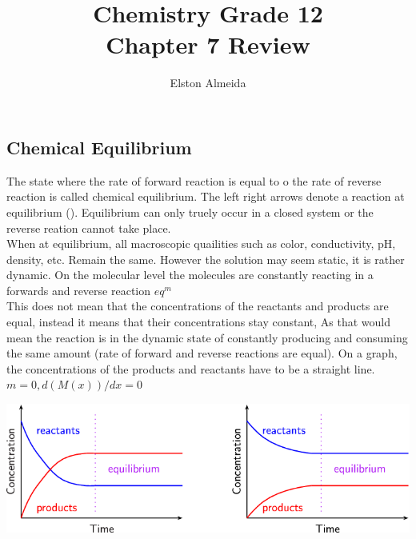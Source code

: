 \documentclass{article}
\begin{document}
\author{Elston Almeida}
\title{Chemistry Grade 12 \\ Chapter 7 Review}
\maketitle

\setcounter{section}{7}

\subsection{Chemical Equilibrium}

\begin{paragraph}
  \noindent
  The state where the rate of forward reaction is equal to o the rate of reverse reaction is called chemical equilibrium. The left right arrows denote a reaction at equilibrium (\ce{<=>}). Equilibrium can only truely occur in a closed system or the reverse reation cannot take place.
\\

When at equilibrium, all macroscopic quailities such as color, conductivity, pH, density, etc. Remain the same. However the solution may seem static, it is rather dynamic. On the molecular level the molecules are constantly reacting in a forwards and reverse reaction $eq^m$
\\

This does not mean that the concentrations of the reactants and products are equal, instead it means that their concentrations stay constant, As that would mean the reaction is in the dynamic state of constantly producing and consuming the same amount (rate of forward and reverse reactions are equal). On a graph, the concentrations of the products and reactants have to be a straight line. $m=0, d(M(x))/dx=0$
\\
\vspace{2pc}

\begin{adjustbox}{center}
\includegraphics[scale=0.5]{eqGraph.png}
\end{adjustbox}


\end{paragraph}
\end{document}
